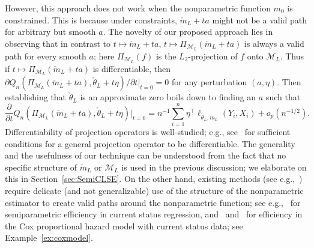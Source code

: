 However, this approach does not work when the nonparametric function $m_0$ is constrained. This is because under constraints,  $\check{m}_L + t a$ might not be a valid path for arbitrary but smooth $a$.
 The novelty of our proposed approach lies in observing that in contrast to $t\mapsto\check{m}_L + ta$, $t \mapsto\Pi_{\mathcal{M}_L}(\check{m}_L + ta)$ is always a valid path for every smooth $a$; here $\Pi_{\mathcal{M}_L}(f)$ is the $L_2$-projection of $f$ onto $\mathcal{M}_L$. Thus if $t\mapsto \Pi_{\mathcal{M}_L}(\check{m}_L + ta)$ is differentiable, then $\partial Q_n(\Pi_{\mathcal{M}_L}(\check{m}_L + ta), \check{\theta}_L + t\eta)/\partial t|_{t = 0} = 0$ for any perturbation $(a,\eta)$. Then establishing that $\check{\theta}_L$ is an approximate zero boils down to finding an $a$ such that 
 \[
 \frac{\partial }{\partial t}Q_n(\Pi_{\mathcal{M}_L}(\check{m}_L + ta), \check{\theta}_L + t\eta)\Big|_{t = 0}= n^{-1}\sum_{i=1}^n \eta^\top  \ell_{\check{\theta}_L, \check{m}_L}(Y_i, X_i) +o_p(n^{-1/2}).
 \]
  Differentiability of projection operators is well-studied; e.g., see~\cite{dharanipragada1996quadratically,fitzpatrick1982differentiability,mccormick1972gradient,shapiro1994existence,sokolowski1992shape} for sufficient conditions for a general projection operator to be differentiable. The generality and the usefulness of our technique can be understood from the fact that no specific structure of $\check{m}_L$ or $\mathcal{M}_L$ is used in the previous discussion; we elaborate on this in Section~\ref{sec:SemiCLSE}. On the other hand, existing methods (see e.g.,~\cite{VANC}) require delicate (and not generalizable) use of the structure of the nonparametric estimator to create valid paths around the nonparametric function; see e.g.,~\cite{VANC} for semiparametric efficiency in  current status regression, and~\cite[Chapter 9.3]{VdV02} and~\cite{MR1394975} for efficiency in the Cox proportional hazard model with current status data; see Example~\ref{ex:coxmodel}. 




